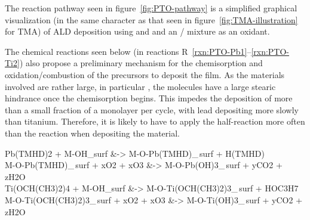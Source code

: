 The reaction pathway seen in figure~\vref{fig:PTO-pathway} is a simplified graphical visualization (in the same character as that seen in figure~\vref{fig:TMA-illustration} for TMA) of ALD deposition using \TMHD{} and \TiOiPr{} and an / mixture as an oxidant.  

The chemical reactions seen below (in reactions R~\ref{rxn:PTO-Pb1}--\ref{rxn:PTO-Ti2}) also propose a preliminary mechanism for the chemisorption and oxidation/combustion of the precursors to deposit the film. As the materials involved are rather large, in particular \TMHD{}, the molecules have a large stearic hindrance once the chemisorption begins. This impedes the deposition of more than a small fraction of a monolayer per cycle, with lead depositing more slowly than titanium. Therefore, it is likely to have to apply the \TMHD{} half-reaction more often than the \TiOiPr{} reaction when depositing the material. 

{\footnotesize \addtocounter{reaction}{-2} \onehalfspacing
\begin{reactions}
	Pb(TMHD)2 + M-OH_{surf} &-> M-O-Pb(TMHD)_{\,surf} + H(TMHD) \label{rxn:PTO-Pb1}%
		\\
	M-O-Pb(TMHD)_{\,surf} + xO2 + xO3 &-> M-O-Pb(OH)3_{\,surf} + yCO2 + zH2O \label{rxn:PTO-Pb2}%
		\\
	Ti(OCH(CH3)2)4 + M-OH_{surf} &-> M-O-Ti(OCH(CH3)2)3_{\,surf} + HOC3H7 \label{rxn:PTO-Ti1}%
		\\
	M-O-Ti(OCH(CH3)2)3_{\,surf} + xO2 + xO3 &-> M-O-Ti(OH)3_{\,surf} + yCO2 + zH2O \label{rxn:PTO-Ti2}%
\end{reactions}
}

